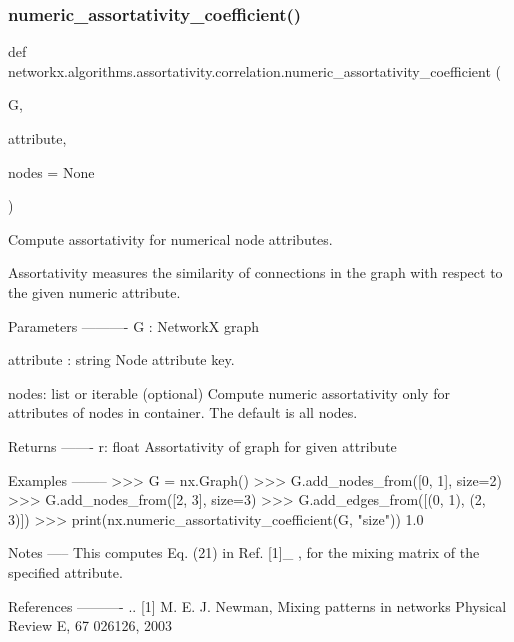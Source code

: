 \mbox{\label{namespacenetworkx_1_1algorithms_1_1assortativity_1_1correlation_abbfe3c18569e6eff2686dd425a1f145a}} 
\subsubsection{\texorpdfstring{numeric\+\_\+assortativity\+\_\+coefficient()}{numeric\_assortativity\_coefficient()}}
{\footnotesize\ttfamily def networkx.\+algorithms.\+assortativity.\+correlation.\+numeric\+\_\+assortativity\+\_\+coefficient (\begin{DoxyParamCaption}\item[{}]{G,  }\item[{}]{attribute,  }\item[{}]{nodes = {\ttfamily None} }\end{DoxyParamCaption})}

\begin{DoxyVerb}Compute assortativity for numerical node attributes.

Assortativity measures the similarity of connections
in the graph with respect to the given numeric attribute.

Parameters
----------
G : NetworkX graph

attribute : string
    Node attribute key.

nodes: list or iterable (optional)
    Compute numeric assortativity only for attributes of nodes in
    container. The default is all nodes.

Returns
-------
r: float
   Assortativity of graph for given attribute

Examples
--------
>>> G = nx.Graph()
>>> G.add_nodes_from([0, 1], size=2)
>>> G.add_nodes_from([2, 3], size=3)
>>> G.add_edges_from([(0, 1), (2, 3)])
>>> print(nx.numeric_assortativity_coefficient(G, "size"))
1.0

Notes
-----
This computes Eq. (21) in Ref. [1]_ , for the mixing matrix
of the specified attribute.

References
----------
.. [1] M. E. J. Newman, Mixing patterns in networks
       Physical Review E, 67 026126, 2003
\end{DoxyVerb}
 